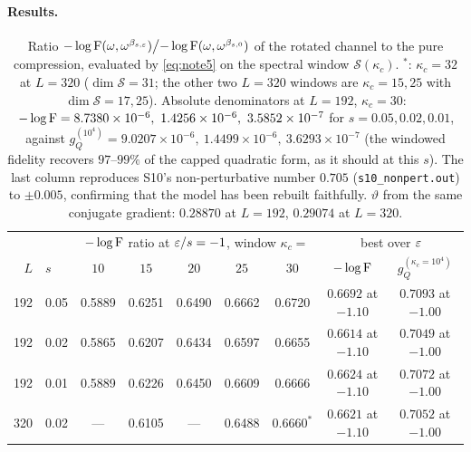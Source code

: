 \documentclass[11pt]{article}
\newcommand{\e}[1]{\times10^{#1}}
\begin{document}
\paragraph{Results.}
\begin{table}[h]\centering\small
\begin{tabular}{rlccccc|cc}
\toprule
&&\multicolumn{5}{c|}{$-\log\operatorname{F}$ ratio at $\varepsilon/s=-1$, window $\kappa_c=$}&
\multicolumn{2}{c}{best over $\varepsilon$}\\
$L$&$s$&$10$&$15$&$20$&$25$&$30$&$-\log\operatorname{F}$&$g_Q^{(\kappa_c=10^4)}$\\
\midrule
192&0.05&0.5889&0.6251&0.6490&0.6662&0.6720&$0.6692$ at $-1.10$&$0.7093$ at $-1.00$\\
192&0.02&0.5865&0.6207&0.6434&0.6597&0.6655&$0.6614$ at $-1.10$&$0.7049$ at $-1.00$\\
192&0.01&0.5889&0.6226&0.6450&0.6609&0.6666&$0.6624$ at $-1.10$&$0.7072$ at $-1.00$\\
320&0.02&---&0.6105&---&0.6488&$0.6660^{\ast}$&$0.6621$ at $-1.10$&$0.7052$ at $-1.00$\\
\bottomrule
\end{tabular}
\caption{Ratio $-\log\operatorname{F}(\omega,\omega^{\beta_{s,\varepsilon}})\big/{-\log\operatorname{F}(\omega,\omega^{\beta_{s,0}})}$
of the rotated channel to the pure compression, evaluated by \eqref{eq:note5} on the spectral
window $\mathcal S(\kappa_c)$.  ${}^{\ast}$: $\kappa_c=32$ at $L=320$ ($\dim\mathcal S=31$;
the other two $L=320$ windows are $\kappa_c=15,25$ with $\dim\mathcal S=17,25$).  Absolute
denominators at $L=192$, $\kappa_c=30$:
$-\log\Fid=8.7380\e{-6},\ 1.4256\e{-6},\ 3.5852\e{-7}$ for $s=0.05,0.02,0.01$, against
$g_Q^{(10^4)}=9.0207\e{-6},\ 1.4499\e{-6},\ 3.6293\e{-7}$ (the windowed fidelity recovers
$97$--$99\%$ of the capped quadratic form, as it should at this $s$).  The last column reproduces
S10's non-perturbative number $0.705$ (\texttt{s10\_nonpert.out}) to $\pm0.005$, confirming that
the model has been rebuilt faithfully.  $\vartheta$ from the same conjugate gradient:
$0.28870$ at $L=192$, $0.29074$ at $L=320$.}
\label{tab:exactF}
\end{table}
\end{document}
